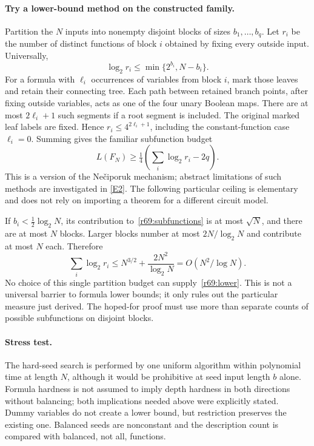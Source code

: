 \documentclass[11pt,a4paper]{article}
\newcommand{\eref}[2]{\hyperlink{extra:#1:#2}{[E#2]}}
\numberwithin{equation}{section}
\begin{document}
\paragraph{Try a lower-bound method on the constructed family.}
Partition the $N$ inputs into nonempty disjoint blocks of sizes $b_1,\ldots,b_q$. Let $r_i$ be the number of distinct functions of block $i$ obtained by fixing every outside input. Universally,
\begin{equation}\label{r69:subfunctions}
 \log_2r_i\le\min\{2^{b_i},N-b_i\}.
\end{equation}
For a formula with $\ell_i$ occurrences of variables from block $i$, mark those leaves and retain their connecting tree. Each path between retained branch points, after fixing outside variables, acts as one of the four unary Boolean maps. There are at most $2\ell_i+1$ such segments if a root segment is included. The original marked leaf labels are fixed. Hence $r_i\le4^{2\ell_i+1}$, including the constant-function case $\ell_i=0$. Summing gives the familiar subfunction budget
\[
 L(F_N)\ge\tfrac14\left(\sum_i\log_2r_i-2q\right).
\]
This is a version of the Nečiporuk mechanism; abstract limitations of such methods are investigated in \eref{30006707}{2}. The following particular ceiling is elementary and does not rely on importing a theorem for a different circuit model.

If $b_i<\frac12\log_2N$, its contribution to~\eqref{r69:subfunctions} is at most $\sqrt N$, and there are at most $N$ blocks. Larger blocks number at most $2N/\log_2N$ and contribute at most $N$ each. Therefore
\[
 \sum_i\log_2r_i\le N^{3/2}+\frac{2N^2}{\log_2N}
       =O(N^2/\log N).
\]
No choice of this single partition budget can supply~\eqref{r69:lower}. This is not a universal barrier to formula lower bounds; it only rules out the particular measure just derived. The hoped-for proof must use more than separate counts of possible subfunctions on disjoint blocks.

\paragraph{Stress test.}
The hard-seed search is performed by one uniform algorithm within polynomial time at length $N$, although it would be prohibitive at seed input length $b$ alone. Formula hardness is not assumed to imply depth hardness in both directions without balancing; both implications needed above were explicitly stated. Dummy variables do not create a lower bound, but restriction preserves the existing one. Balanced seeds are nonconstant and the description count is compared with balanced, not all, functions.
\end{document}
